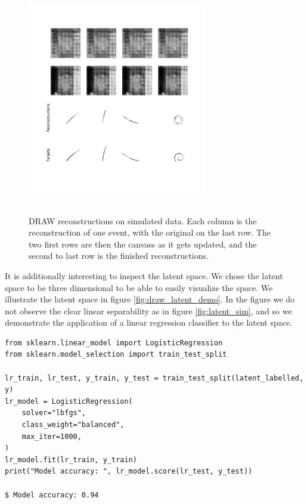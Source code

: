 \begin{figure}
	\centering
	\includegraphics[width=0.7\textwidth, height=10cm]{reconst.pdf}
	\caption[DRAW reconstructions on simulated data]{DRAW reconstructions on simulated data. Each column is the reconstruction of one event, with the original on the last row. The two first rows are then the canvass as it gets updated, and the second to last row is the finished reconstructions.}
	\label{fig:draw_reconst}
\end{figure}

It is additionally interesting to inspect the latent space. We chose the latent space to be three dimensional to be able to easily visualize the space. We illustrate the latent space in figure \ref{fig:draw_latent_demo}. In the figure we do not observe the clear linear separability as in figure \ref{fig:latent_sim}, and so we demonstrate the application of a linear regression classifier to the latent space.

\begin{minipage}{\linewidth}
\begin{lstlisting}[language=iPython]
from sklearn.linear_model import LogisticRegression
from sklearn.model_selection import train_test_split

lr_train, lr_test, y_train, y_test = train_test_split(latent_labelled, y)
lr_model = LogisticRegression(
	solver="lbfgs",
	class_weight="balanced",
	max_iter=1000,
)
lr_model.fit(lr_train, y_train)
print("Model accuracy: ", lr_model.score(lr_test, y_test))

$ Model accuracy: 0.94
\end{lstlisting}
\end{minipage}

